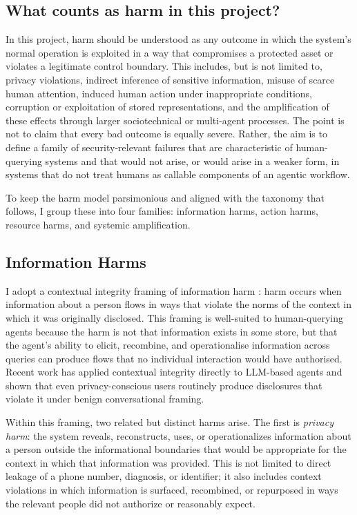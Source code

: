 \documentclass[11pt]{article}
\begin{document}
\subsection{What counts as harm in this project?}

In this project, harm should be understood as any outcome in which the system's normal operation is exploited in a way that compromises a protected asset or violates a legitimate control boundary. This includes, but is not limited to, privacy violations, indirect inference of sensitive information, misuse of scarce human attention, induced human action under inappropriate conditions, corruption or exploitation of stored representations, and the amplification of these effects through larger sociotechnical or multi-agent processes. The point is not to claim that every bad outcome is equally severe. Rather, the aim is to define a family of security-relevant failures that are characteristic of human-querying systems and that would not arise, or would arise in a weaker form, in systems that do not treat humans as callable components of an agentic workflow. \citep{oliver2026humanapi,schroeder2025multiagentsecurity}

To keep the harm model parsimonious and aligned with the taxonomy that follows, I group these into four families: information harms, action harms, resource harms, and systemic amplification.

\subsection{Information Harms}

I adopt a contextual integrity framing of information harm \citep{nissenbaum2009contextualintegrity,brown2022privacylm}: harm occurs when information about a person flows in ways that violate the norms of the context in which it was originally disclosed. This framing is well-suited to human-querying agents because the harm is not that information exists in some store, but that the agent's ability to elicit, recombine, and operationalise information across queries can produce flows that no individual interaction would have authorised. Recent work has applied contextual integrity directly to LLM-based agents and shown that even privacy-conscious users routinely produce disclosures that violate it under benign conversational framing. \citep{mireshghallah2024confaide,ngong2025contextualprivacy}

Within this framing, two related but distinct harms arise. The first is \emph{privacy harm}: the system reveals, reconstructs, uses, or operationalizes information about a person outside the informational boundaries that would be appropriate for the context in which that information was provided. This is not limited to direct leakage of a phone number, diagnosis, or identifier; it also includes context violations in which information is surfaced, recombined, or repurposed in ways the relevant people did not authorize or reasonably expect. \citep{brown2022privacylm}
\end{document}
